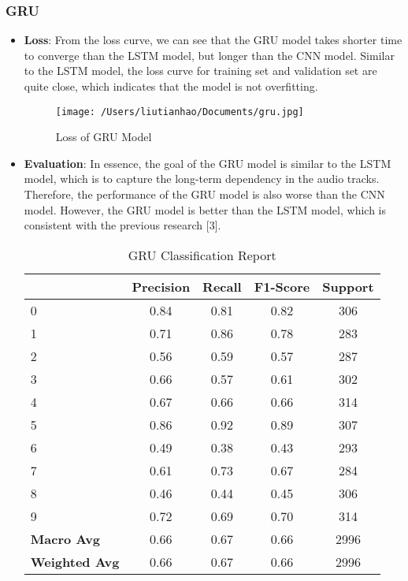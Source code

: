\documentclass{article}
\begin{document}
\subsubsection{GRU}
\begin{itemize}
  \item \textbf{Loss}: From the loss curve, we can see that the GRU model takes shorter time to converge than the LSTM model, but longer than the CNN model.
  Similar to the LSTM model, the loss curve for training set and validation set are quite close, which indicates that the model is not overfitting.
  \begin{figure}[h]
    \centering
    \texttt{[image: /Users/liutianhao/Documents/gru.jpg]}
    \caption{Loss of GRU Model}
  \end{figure}
  \item \textbf{Evaluation}: In essence, the goal of the GRU model is similar to the LSTM model, which is to capture the long-term dependency in the audio tracks.
  Therefore, the performance of the GRU model is also worse than the CNN model. However, the GRU model is better than the LSTM model, which is consistent with the previous research [3].

  \begin{table}[h]
    \centering
    \caption{GRU Classification Report}
    \begin{tabular}{lcccc}
        \toprule
        & Precision & Recall & F1-Score & Support \\
        \midrule
        0 & 0.84 & 0.81 & 0.82 & 306 \\
        1 & 0.71 & 0.86 & 0.78 & 283 \\
        2 & 0.56 & 0.59 & 0.57 & 287 \\
        3 & 0.66 & 0.57 & 0.61 & 302 \\
        4 & 0.67 & 0.66 & 0.66 & 314 \\
        5 & 0.86 & 0.92 & 0.89 & 307 \\
        6 & 0.49 & 0.38 & 0.43 & 293 \\
        7 & 0.61 & 0.73 & 0.67 & 284 \\
        8 & 0.46 & 0.44 & 0.45 & 306 \\
        9 & 0.72 & 0.69 & 0.70 & 314 \\
        \midrule
        \textbf{Macro Avg} & 0.66 & 0.67 & 0.66 & 2996 \\
        \textbf{Weighted Avg} & 0.66 & 0.67 & 0.66 & 2996 \\
        \bottomrule
    \end{tabular}
\end{table}
\end{itemize}
\end{document}
